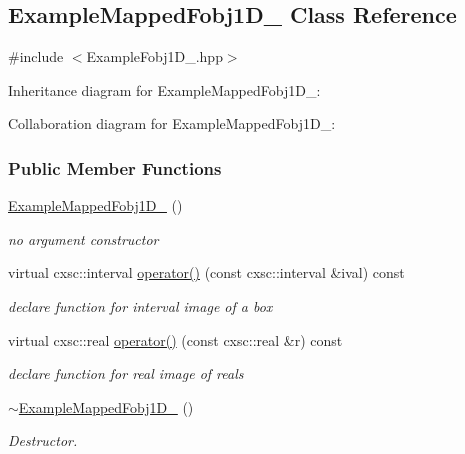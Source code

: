 \hypertarget{classExampleMappedFobj1D__1}{\subsection{\-Example\-Mapped\-Fobj1\-D\-\_ \-Class \-Reference}
\label{classExampleMappedFobj1D__1}
}


{\ttfamily \#include $<$\-Example\-Fobj1\-D\-\_.\-hpp$>$}



\-Inheritance diagram for \-Example\-Mapped\-Fobj1\-D\-\_\-:


\-Collaboration diagram for \-Example\-Mapped\-Fobj1\-D\-\_\-:
\subsubsection*{\-Public \-Member \-Functions}
\begin{DoxyCompactItemize}
\item 
\hyperlink{classExampleMappedFobj1D__1_a84d74c5e6f1bed61579c0aed621605ff}{\-Example\-Mapped\-Fobj1\-D\-\_} ()
\begin{DoxyCompactList}\small\item\em no argument constructor \end{DoxyCompactList}\item 
virtual cxsc\-::interval \hyperlink{classExampleMappedFobj1D__1_a4d5f2ed115ce314518f2fa487ed108dc}{operator()} (const cxsc\-::interval \&ival) const 
\begin{DoxyCompactList}\small\item\em declare function for interval image of a box \end{DoxyCompactList}\item 
virtual cxsc\-::real \hyperlink{classExampleMappedFobj1D__1_a5d3d122bdcad631dcc019fa426e3962d}{operator()} (const cxsc\-::real \&r) const 
\begin{DoxyCompactList}\small\item\em declare function for real image of reals \end{DoxyCompactList}\item 
\hyperlink{classExampleMappedFobj1D__1_a299121c49dc10d0bf21204a5c719fac0}{$\sim$\-Example\-Mapped\-Fobj1\-D\-\_} ()
\begin{DoxyCompactList}\small\item\em \-Destructor. \end{DoxyCompactList}\end{DoxyCompactItemize}


